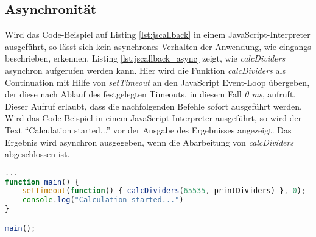 \subsection*{Asynchronität}
Wird das Code-Beispiel auf Listing \ref{lst:jscallback} in einem JavaScript-Interpreter ausgeführt, so lässt sich kein asynchrones Verhalten der Anwendung, wie eingangs beschrieben, erkennen. Listing \ref{lst:jscallback_async} zeigt, wie \textit{calcDividers} asynchron aufgerufen werden kann. Hier wird die Funktion \mbox{\textit{calcDividers}} als Continuation mit Hilfe von \textit{setTimeout} an den JavaScript Event-Loop übergeben, der diese nach Ablauf des festgelegten Timeouts, in diesem Fall \textit{0 ms}, aufruft. Dieser Aufruf erlaubt, dass die nachfolgenden Befehle sofort ausgeführt werden. Wird das Code-Beispiel in einem JavaScript-Interpreter ausgeführt, so wird der Text ``Calculation started...'' vor der Ausgabe des Ergebnisses angezeigt. Das Ergebnis wird asynchron ausgegeben, wenn die Abarbeitung von \textit{calcDividers} abgeschlossen ist.
\begin{lstlisting}[language=JavaScript,caption=JavaScript setTimeout Beispiel,label=lst:jscallback_async]
...
function main() {
	setTimeout(function() { calcDividers(65535, printDividers) }, 0);
	console.log("Calculation started...")
}

main();
\end{lstlisting}
\acresetall
